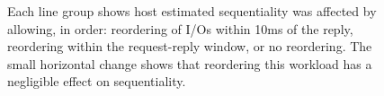\begin{figure}
\vspace{-0.1in}
\caption{Each line group shows host estimated sequentiality was affected by allowing, in order: 
reordering of I/Os within 10ms of the
reply, reordering within the request-reply window, or no reordering.
The small horizontal change shows that reordering 
this workload has a negligible effect on sequentiality.}
\label{fig:seq-bytes-compare}
\end{figure}

